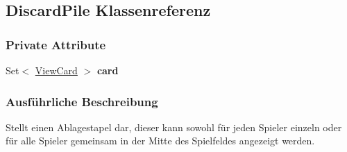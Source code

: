 \hypertarget{a00009}{\subsection{Discard\-Pile Klassenreferenz}
\label{a00009}
}
\subsubsection*{Private Attribute}
\begin{DoxyCompactItemize}
\item 
\hypertarget{a00009_a32963d9bbf9a4ad1ca8d0e1cf6c54bfe}{Set$<$ \hyperlink{a00022}{View\-Card} $>$ {\bfseries card}}\label{a00009_a32963d9bbf9a4ad1ca8d0e1cf6c54bfe}

\end{DoxyCompactItemize}


\subsubsection{Ausführliche Beschreibung}
Stellt einen Ablagestapel dar, dieser kann sowohl für jeden Spieler einzeln oder für alle Spieler gemeinsam in der Mitte des Spielfeldes angezeigt werden. 